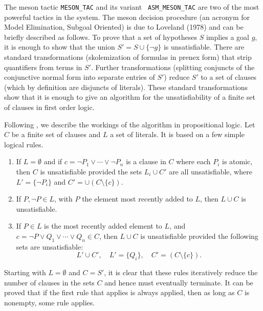 \documentclass{llncs}
\begin{document}
The meson tactic {\tt MESON\_TAC} and its variant {\tt
  ASM\_MESON\_TAC} are two of the most powerful tactics in the system.
  The meson decision procedure (an
acronym for Model Elimination, Subgoal Oriented) is due to Loveland
(1978) and can be briefly described as follows.  To prove that a set
of hypotheses $S$ implies a goal $g$, it is enough to show that the
union $S' = S \cup \{\lnot g\}$ is unsatisfiable.  There are standard
transformations (skolemization of formulas in prenex form) that strip
quantifiers from terms in $S'$.  Further transformations (splitting
conjuncts of the conjunctive normal form into separate entries of
$S'$) reduce $S'$ to a set of clauses (which by definition are
disjuncts of literals).  These standard transformations show that it
is enough to give an algorithm for the unsatisfiability of a finite
set of clauses in first order logic.

Following \cite{Ha09}, we describe the workings of the algorithm in propositional
logic.  Let  $C$ be a finite set of clauses and $L$ a set of literals.
It is based on a few simple logical rules.
\begin{enumerate}
\item If $L=\emptyset$ and if $c = \lnot P_1 \lor \cdots\lor \lnot
  P_n$ is a clause in $C$ where each $P_i$ is atomic, then $C$ is
  unsatisfiable provided the sets $L_i\cup C'$ are all unsatisfiable,
  where $L' =\{\lnot P_i\}$ and $C'= \cup (C\setminus \{c\})$.
\item If $P,\lnot P\in L$, with $P$ the element most recently added to $L$,
then $L\cup C$
is unsatisfiable.
\item If $P\in L$ is the most recently added element to $L$, and
  $c=\lnot P \lor Q_1 \lor \cdots\lor Q_n\in C$, then $L\cup C$ is
  unsatisfiable provided the following sets are unsatisfiable:
\begin{equation}\label{eqn:cup}
L' \cup C',\quad L'=\{Q_i\},\quad C' = (C\setminus \{c\}).
\end{equation}
\end{enumerate}
Starting with $L=\emptyset$ and $C=S'$, 
it is clear that these rules iteratively 
reduce the number of clauses in the sets $C$ and
hence must eventually terminate.  It can be proved that if the first rule
that applies is always applied, then as long as $C$ is nonempty, some rule
applies.
\end{document}
